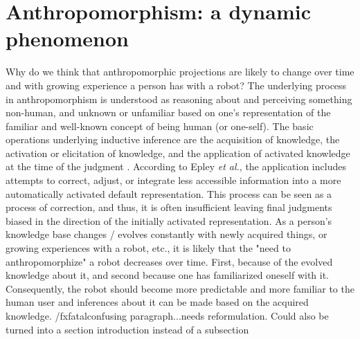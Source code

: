 \documentclass{frontiersSCNS} %
\begin{document}




%
%
%
%
%
%
%
%
%

\section{Anthropomorphism: a dynamic phenomenon}
\label{sec:our-ideas}

Why do we think that anthropomorphic projections are likely to change over time
and with growing experience a person has with a robot? The underlying process in
anthropomorphism is understood as reasoning about and perceiving something
non-human, and unknown or unfamiliar based on one's representation of the
familiar and well-known concept of being human (or one-self). The basic
operations underlying inductive inference are the acquisition of knowledge, the
activation or elicitation of knowledge, and the application of activated
knowledge at the time of the judgment \citep{epley_when_2008}. According to Epley
\textit{et al.}, the application includes attempts to correct, adjust, or
integrate less accessible information into a more automatically activated
default representation. This process can be seen as a process of correction, and
thus, it is often insufficient leaving final judgments biased in the direction
of the initially activated representation. As a person's knowledge base changes
/ evolves constantly with newly acquired things, or growing experiences with a
robot, etc., it is likely that the "need to anthropomorphize" a robot decreases
over time. First, because of the evolved knowledge about it, and second because
one has familiarized oneself with it. Consequently, the robot should become more
predictable and more familiar to the human user and inferences about it can be
made based on the acquired knowledge.  /fxfatal{confusing paragraph...needs
reformulation. Could also be turned into a section introduction instead of a
subsection}
\end{document}

